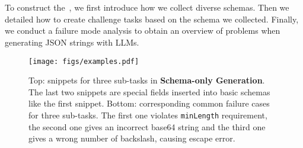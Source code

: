 

\section{\ourbench}
To construct the~\ourbench, we first introduce how we collect diverse schemas.
Then we detailed how to create challenge tasks based on the schema we collected.
Finally, we conduct a failure mode analysis to obtain an overview of problems when generating JSON strings with LLMs.



\begin{figure*}[htb]
    \centering
    \texttt{[image: figs/examples.pdf]}
    \caption{Top: snippets for three sub-tasks in \textbf{Schema-only Generation}. The last two snippets are special fields inserted into basic schemas like the first snippet. Bottom: corresponding common failure cases for three sub-tasks. The first one violates \texttt{minLength} requirement, the second one gives an incorrect base64 string and the third one gives a wrong number of backslash, causing escape error.}
    \label{fig:schema-only-snippets}
\end{figure*}
